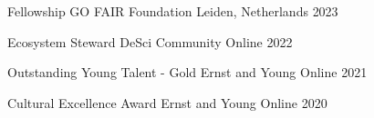 
\begin{cvhonors}

  \cvhonor
    {Fellowship} %
    {GO FAIR Foundation} %
    {Leiden, Netherlands} %
    {2023} %

  \cvhonor
    {Ecosystem Steward} %
    {DeSci Community} %
    {Online} %
    {2022} %

  \cvhonor
    {Outstanding Young Talent - Gold} %
    {Ernst and Young} %
    {Online} %
    {2021} %

  \cvhonor
    {Cultural Excellence Award} %
    {Ernst and Young} %
    {Online} %
    {2020} %

\end{cvhonors}
